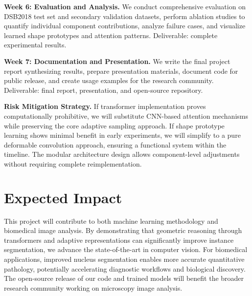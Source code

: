 \documentclass[acmlarge]{acmart}
\begin{document}
\textbf{Week 6: Evaluation and Analysis.} We conduct comprehensive evaluation on DSB2018 test set and secondary validation datasets, perform ablation studies to quantify individual component contributions, analyze failure cases, and visualize learned shape prototypes and attention patterns. Deliverable: complete experimental results.

\textbf{Week 7: Documentation and Presentation.} We write the final project report synthesizing results, prepare presentation materials, document code for public release, and create usage examples for the research community. Deliverable: final report, presentation, and open-source repository.

\textbf{Risk Mitigation Strategy.} If transformer implementation proves computationally prohibitive, we will substitute CNN-based attention mechanisms while preserving the core adaptive sampling approach. If shape prototype learning shows minimal benefit in early experiments, we will simplify to a pure deformable convolution approach, ensuring a functional system within the timeline. The modular architecture design allows component-level adjustments without requiring complete reimplementation.

\section{Expected Impact}

This project will contribute to both machine learning methodology and biomedical image analysis. By demonstrating that geometric reasoning through transformers and adaptive representations can significantly improve instance segmentation, we advance the state-of-the-art in computer vision. For biomedical applications, improved nucleus segmentation enables more accurate quantitative pathology, potentially accelerating diagnostic workflows and biological discovery. The open-source release of our code and trained models will benefit the broader research community working on microscopy image analysis.
\end{document}
